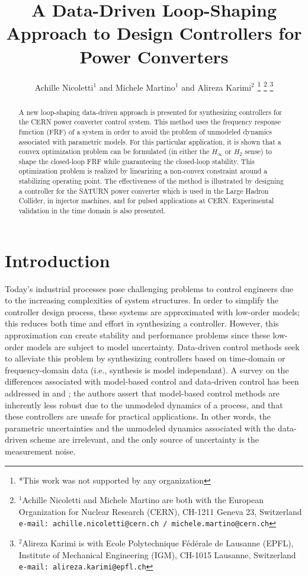 \documentclass[a4paper, 10pt, conference]{ieeeconf}
\title{A Data-Driven Loop-Shaping Approach to Design Controllers for Power Converters}
\author{Achille Nicoletti$^{1}$ and Michele Martino$^{1}$ and Alireza Karimi$^{2}$%
\thanks{*This work was not supported by any organization}%
\thanks{$^{1}$Achille Nicoletti and Michele Martino are both with the European Organization for Nuclear Research (CERN), 
 CH-1211 Geneva 23, Switzerland
        {\tt\small  e-mail: achille.nicoletti@cern.ch / michele.martino@cern.ch}}%
\thanks{$^{2}$Alireza Karimi is with Ecole Polytechnique F\'{e}d\'{e}rale de Lausanne (EPFL), Institute of Mechanical Engineering (IGM),
   CH-1015 Lausanne, Switzerland
        {\tt\small e-mail: alireza.karimi@epfl.ch}}%
}
\begin{document}
\maketitle
\thispagestyle{empty}
\pagestyle{empty}

\begin{abstract}                %
A new loop-shaping data-driven approach is presented for synthesizing controllers for the CERN power converter control system. This method uses the frequency response function (FRF) of a system in order to avoid the problem of unmodeled dynamics associated with parametric models. For this particular application, it is shown that a convex optimization problem can be formulated (in either the $H_\infty$ or $H_2$ sense) to shape the closed-loop FRF while guaranteeing the closed-loop stability. This optimization problem is realized by linearizing a non-convex constraint around a stabilizing operating point. The effectiveness of the method is illustrated by designing a controller for the SATURN power converter which is used in the Large Hadron Collider, in injector machines, and for pulsed applications at CERN. Experimental validation in the time domain is also presented. 
\end{abstract}


\section{Introduction}
Today's industrial processes pose challenging problems to control engineers due to the increasing complexities of system structures. In order to simplify the controller design process, these systems are approximated with low-order models; this reduces both time and effort in synthesizing a controller. However, this approximation can create stability and performance problems since these low-order models are subject to model uncertainty. Data-driven control methods seek to alleviate this problem by synthesizing controllers based on time-domain or frequency-domain data (i.e., synthesis is model independant). A survey on the differences associated with model-based control and data-driven control has been addressed in \cite{HW13} and \cite{BCE12}; the authors assert that model-based control methods are inherently less robust due to the unmodeled dynamics of a process, and that these controllers are unsafe for practical applications. In other words, the parametric uncertainties and the unmodeled dynamics associated with the data-driven scheme are irrelevant, and the only source of uncertainty is the measurement noise. 
\end{document}
